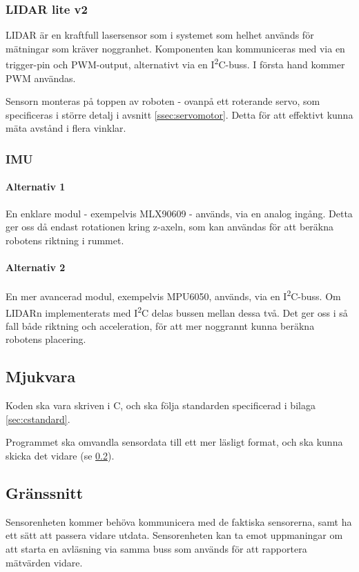 \documentclass[a4paper,11pt]{article}
\begin{document}
\subsubsection{LIDAR lite v2} \label{sssec:lidar}
LIDAR är en kraftfull lasersensor som i systemet som helhet används för mätningar som kräver noggranhet. Komponenten kan kommuniceras med via en trigger-pin och PWM-output, alternativt via en I\textsuperscript{2}C-buss. I första hand kommer PWM användas.

Sensorn monteras på toppen av roboten - ovanpå ett roterande servo, som specificeras i större detalj i avsnitt \ref{ssec:servomotor}. Detta för att effektivt kunna mäta avstånd i flera vinklar.

\subsubsection{IMU} \label{sssec:imu}

\paragraph{Alternativ 1}
En enklare modul - exempelvis MLX90609 - används, via en analog ingång. Detta ger oss då endast rotationen kring z-axeln, som kan användas för att beräkna robotens riktning i rummet.

\paragraph{Alternativ 2}
En mer avancerad modul, exempelvis MPU6050, används, via en I\textsuperscript{2}C-buss. Om LIDARn implementerats med I\textsuperscript{2}C delas bussen mellan dessa två. Det ger oss i så fall både riktning och acceleration, för att mer noggrannt kunna beräkna robotens placering.%

\subsection{Mjukvara}

Koden ska vara skriven i C, och ska följa standarden specificerad i bilaga \ref{sec:cstandard}.

Programmet ska omvandla sensordata till ett mer läsligt format, och ska kunna skicka det vidare (se \ref{ssec:sensorInterface}).

\subsection{Gränssnitt} \label{ssec:sensorInterface}
Sensorenheten kommer behöva kommunicera med de faktiska sensorerna, samt ha ett sätt att passera vidare utdata. Sensorenheten kan ta emot uppmaningar om att starta en avläsning via samma buss som används för att rapportera mätvärden vidare.
\end{document}
